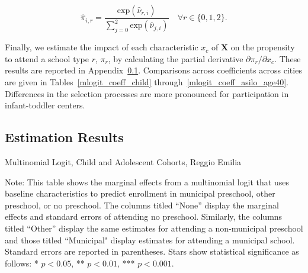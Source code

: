 \begin{equation}
\hat{\pi}_{i,r} = \frac{\text{exp}(\hat{\nu}_{r,i})}{\sum\limits_{j=0}^{2} \text{exp}(\hat{\nu}_{j,i})} \quad \forall  r \in \{0,1,2\}.
\end{equation}

Finally, we estimate the impact of each characteristic $x_c$ of $\bm{X}$ on the propensity to attend a school type $r$, $\pi_{r}$, by calculating the partial derivative $\partial \pi_{r}/\partial x_c$. These results are reported in Appendix~\ref{appendix:mlogit}. Comparisons across coefficients across cities are given in Tables~\ref{mlogit_coeff_child} through~\ref{mlogit_coeff_asilo_age40}. Differences in the selection processes are more pronounced for participation in infant-toddler centers.


\subsection{Estimation Results}\label{appendix:mlogit}



\begin{table}[H]
\centering
\caption{Multinomial Logit, Child and Adolescent Cohorts, Reggio Emilia} \label{mlogit-chi-ado-RE}
\begin{adjustbox}{width=\textwidth}
\begin{threeparttable}

\begin{tablenotes}
\footnotesize\raggedright{Note: This table shows the marginal effects from a multinomial logit that uses baseline characteristics to predict enrollment in municipal preschool, other preschool, or no preschool. The columns titled ``None'' display the marginal effects and standard errors of attending no preschool. Similarly, the columns titled ``Other'' display the same estimates for attending a non-municipal preschool and those titled ``Municipal" display estimates for attending a municipal school. Standard errors are reported in parentheses. Stars show statistical significance as follows: * $p < 0.05$, ** $p < 0.01$, *** $p < 0.001$.}
\end{tablenotes}
\end{threeparttable}
\end{adjustbox}
\end{table}

